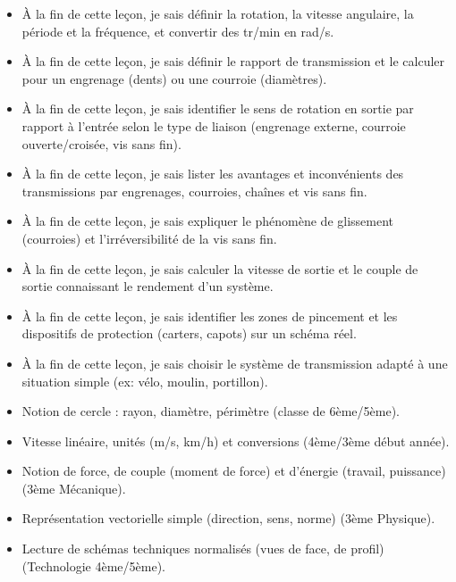 \documentclass[11pt]{article}
\begin{document}
\begin{objectifs}
\begin{itemize}
\item À la fin de cette leçon, je sais définir la rotation, la vitesse angulaire, la période et la fréquence, et convertir des tr/min en rad/s.
\item À la fin de cette leçon, je sais définir le rapport de transmission et le calculer pour un engrenage (dents) ou une courroie (diamètres).
\item À la fin de cette leçon, je sais identifier le sens de rotation en sortie par rapport à l'entrée selon le type de liaison (engrenage externe, courroie ouverte/croisée, vis sans fin).
\item À la fin de cette leçon, je sais lister les avantages et inconvénients des transmissions par engrenages, courroies, chaînes et vis sans fin.
\item À la fin de cette leçon, je sais expliquer le phénomène de glissement (courroies) et l'irréversibilité de la vis sans fin.
\item À la fin de cette leçon, je sais calculer la vitesse de sortie et le couple de sortie connaissant le rendement d'un système.
\item À la fin de cette leçon, je sais identifier les zones de pincement et les dispositifs de protection (carters, capots) sur un schéma réel.
\item À la fin de cette leçon, je sais choisir le système de transmission adapté à une situation simple (ex: vélo, moulin, portillon).
\end{itemize}
\end{objectifs}

\begin{prerequis}
\begin{itemize}
\item Notion de cercle : rayon, diamètre, périmètre (classe de 6ème/5ème).
\item Vitesse linéaire, unités (m/s, km/h) et conversions (4ème/3ème début année).
\item Notion de force, de couple (moment de force) et d'énergie (travail, puissance) (3ème Mécanique).
\item Représentation vectorielle simple (direction, sens, norme) (3ème Physique).
\item Lecture de schémas techniques normalisés (vues de face, de profil) (Technologie 4ème/5ème).
\end{itemize}
\end{prerequis}
\end{document}
